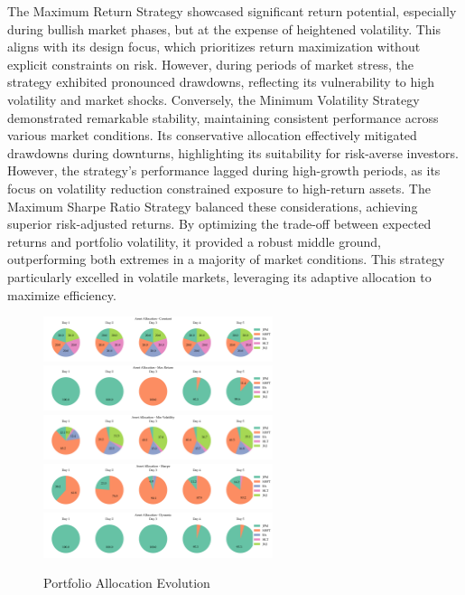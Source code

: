 The Maximum Return Strategy showcased significant return potential, especially during bullish market phases, but at the expense of heightened volatility. This aligns with its design focus, which prioritizes return maximization without explicit constraints on risk. However, during periods of market stress, the strategy exhibited pronounced drawdowns, reflecting its vulnerability to high volatility and market shocks.
Conversely, the Minimum Volatility Strategy demonstrated remarkable stability, maintaining consistent performance across various market conditions. Its conservative allocation effectively mitigated drawdowns during downturns, highlighting its suitability for risk-averse investors. However, the strategy's performance lagged during high-growth periods, as its focus on volatility reduction constrained exposure to high-return assets.
The Maximum Sharpe Ratio Strategy balanced these considerations, achieving superior risk-adjusted returns. By optimizing the trade-off between expected returns and portfolio volatility, it provided a robust middle ground, outperforming both extremes in a majority of market conditions. This strategy particularly excelled in volatile markets, leveraging its adaptive allocation to maximize efficiency.
\begin{figure}[htbp]
    \centering
    \includegraphics[width=0.6\textwidth]{figures/asset_allocations_constant.png}
    \includegraphics[width=0.6\textwidth]{figures/asset_allocations_max_return.png}
    \includegraphics[width=0.6\textwidth]{figures/asset_allocations_min_volatility.png}
    \includegraphics[width=0.6\textwidth]{figures/asset_allocations_sharpe.png}
    \includegraphics[width=0.6\textwidth]{figures/asset_allocations_dynamic.png}
    \caption{Portfolio Allocation Evolution}
    \label{fig:asset_allocations_evolution}
\end{figure}
